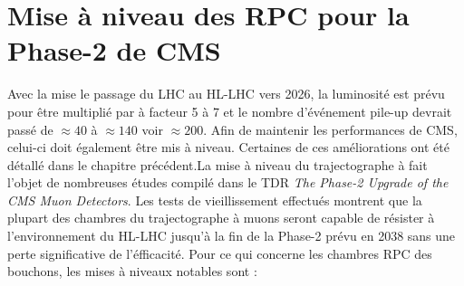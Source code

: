 \section{Mise à niveau des RPC pour la Phase-2 de CMS}
Avec la mise le passage du LHC au HL-LHC vers 2026, la luminosité est prévu pour être multiplié par à facteur \num{5} à \num{7} et le nombre d'événement pile-up devrait passé de $\approx 40$ à $\approx 140$ voir $\approx 200$. Afin de maintenir les performances de CMS, celui-ci doit également être mis à niveau. Certaines de ces améliorations ont été détallé dans le chapitre précédent.La mise à niveau du trajectographe à fait l'objet de nombreuses études compilé dans le TDR \textit{The Phase-2 Upgrade of the CMS Muon Detectors}. Les tests de vieillissement effectués montrent que la plupart des chambres du trajectographe à muons seront capable de résister à l'environnement du HL-LHC jusqu'à la fin de la Phase-2 prévu en 2038 sans une perte significative de l'éfficacité. Pour ce qui concerne les chambres RPC des bouchons, les mises à niveaux notables sont :

